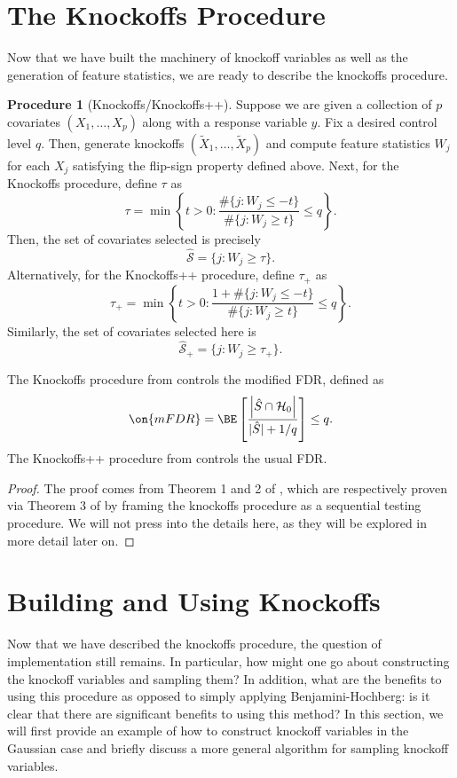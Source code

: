 \documentclass[11pt,reqno]{report}
\theoremstyle{definition}
\newtheorem{proc}[theorem]{Procedure}
\numberwithin{equation}{section}
\begin{document}
\section{The Knockoffs Procedure}
Now that we have built the machinery of knockoff variables as well as the generation of feature statistics, we are ready to describe the knockoffs procedure.
\begin{proc}[Knockoffs/Knockoffs++]
\label{knockproc}
Suppose we are given a collection of $p$ covariates $(X_1, \ldots, X_p)$ along with a response variable $y$. Fix a desired control level $q$. Then, generate knockoffs $(\tilde{X}_1, \ldots, \tilde{X}_p)$ and compute feature statistics $W_j$ for each $X_j$ satisfying the flip-sign property defined above. Next, for the Knockoffs procedure, define $\tau$ as
\begin{equation}
\tau = \min \left\{ t > 0 : \frac{\# \{ j : W_j \leq -t \} }{\# \{ j : W_j \geq t \} } \leq q \right\}.
\end{equation}
Then, the set of covariates selected is precisely
\begin{equation}
\hat{\mathcal{S}} = \{ j : W_j \geq \tau \}.
\end{equation}
Alternatively, for the Knockoffs++ procedure, define $\tau_+$ as 
\begin{equation}
\tau_+ = \min \left\{ t > 0 : \frac{1 + \# \{ j : W_j \leq -t \} }{\# \{ j : W_j \geq t \} } \leq q \right\}.
\end{equation}
Similarly, the set of covariates selected here is 
\begin{equation}
\hat{\mathcal{S}}_+ = \{ j : W_j \geq \tau_+ \}.
\end{equation}
\end{proc}
\begin{theorem}
The Knockoffs procedure from  controls the modified FDR, defined as
\[ \on{mFDR} = \BE \left[ \frac{ \left| \hat{S} \cap \mathcal{H}_0 \right|}{|\hat{S}| + 1 / q} \right] \leq q. \] The Knockoffs++ procedure from  controls the usual FDR.
\end{theorem}
\begin{proof}
The proof comes from Theorem 1 and 2 of \cite{knockoffs}, which are respectively proven via Theorem 3 of \cite{knockoffs} by framing the knockoffs procedure as a sequential testing procedure. We will not press into the details here, as they will be explored in more detail later on.
\end{proof}

\section{Building and Using Knockoffs}
Now that we have described the knockoffs procedure, the question of implementation still remains. In particular, how might one go about constructing the knockoff variables and sampling them? In addition, what are the benefits to using this procedure as opposed to simply applying Benjamini-Hochberg: is it clear that there are significant benefits to using this method? In this section, we will first provide an example of how to construct knockoff variables in the Gaussian case and briefly discuss a more general algorithm for sampling knockoff variables.   
\end{document}
